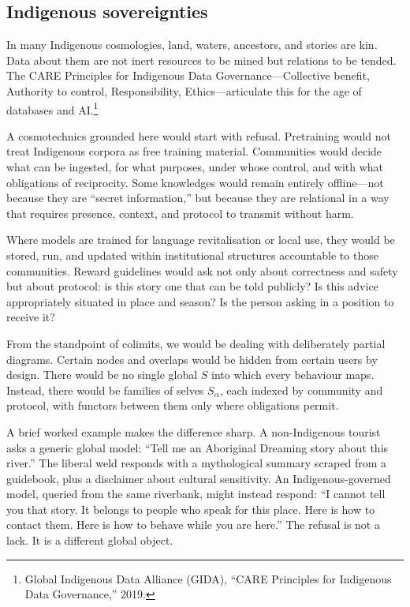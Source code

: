 \subsection{Indigenous sovereignties}

In many Indigenous cosmologies, land, waters, ancestors, and stories are kin. Data about them are not inert resources to be mined but relations to be tended. The CARE Principles for Indigenous Data Governance---Collective benefit, Authority to control, Responsibility, Ethics---articulate this for the age of databases and AI.\footnote{Global Indigenous Data Alliance (GIDA), ``CARE Principles for Indigenous Data Governance,'' 2019.}

A cosmotechnics grounded here would start with refusal. Pretraining would not treat Indigenous corpora as free training material. Communities would decide what can be ingested, for what purposes, under whose control, and with what obligations of reciprocity. Some knowledges would remain entirely offline---not because they are ``secret information,'' but because they are relational in a way that requires presence, context, and protocol to transmit without harm.

Where models are trained for language revitalisation or local use, they would be stored, run, and updated within institutional structures accountable to those communities. Reward guidelines would ask not only about correctness and safety but about protocol: is this story one that can be told publicly? Is this advice appropriately situated in place and season? Is the person asking in a position to receive it?

From the standpoint of colimits, we would be dealing with deliberately partial diagrams. Certain nodes and overlaps would be hidden from certain users by design. There would be no single global $S$ into which every behaviour maps. Instead, there would be families of selves $S_\alpha$, each indexed by community and protocol, with functors between them only where obligations permit.

A brief worked example makes the difference sharp. A non-Indigenous tourist asks a generic global model: ``Tell me an Aboriginal Dreaming story about this river.'' The liberal weld responds with a mythological summary scraped from a guidebook, plus a disclaimer about cultural sensitivity. An Indigenous-governed model, queried from the same riverbank, might instead respond: ``I cannot tell you that story. It belongs to people who speak for this place. Here is how to contact them. Here is how to behave while you are here.'' The refusal is not a lack. It is a different global object.

